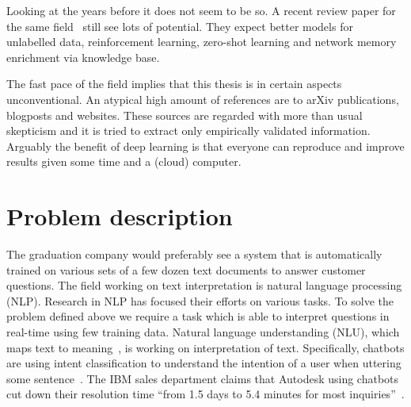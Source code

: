 Looking at the years before it does not seem to be so.
A recent review paper for the same field~\citep{young2018recent} still see lots of potential.
They expect better models for unlabelled data, reinforcement learning, zero-shot learning and network memory enrichment via knowledge base.

The fast pace of the field implies that this thesis is in certain aspects unconventional.
An atypical high amount of references are to arXiv publications, blogposts and websites.
These sources are regarded with more than usual skepticism and it is tried to extract only empirically validated information.
Arguably the benefit of deep learning is that everyone can reproduce and improve results given some time and a (cloud) computer.
\fi

\section{Problem description}
\label{sec:problem_description}
The graduation company would preferably see a system that is automatically trained on various sets of a few dozen text documents to answer customer questions.
The field working on text interpretation is natural language processing (NLP).
Research in NLP has focused their efforts on various tasks.
To solve the problem defined above we require a task which is able to interpret questions in real-time using few training data.
Natural language understanding (NLU), which maps text to meaning~\citep{jurafsky2014speech}, is working on interpretation of text.
Specifically, chatbots are using intent classification to understand the intention of a user when uttering some sentence~\citep{a, b, c, d}.
The IBM sales department claims that Autodesk using chatbots cut down their resolution time ``from 1.5 days to 5.4 minutes for most inquiries''~\citep{ibm2018autodesk}.

